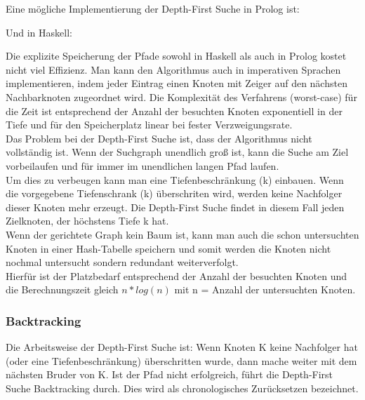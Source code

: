 \bigskip

Eine mögliche Implementierung der Depth-First Suche in Prolog ist:\\




\bigskip

Und in Haskell:\\
\newpage



\bigskip

Die explizite Speicherung der Pfade sowohl in Haskell als auch in Prolog kostet nicht viel Effizienz. Man kann den Algorithmus auch in imperativen Sprachen implementieren, indem jeder Eintrag einen Knoten mit Zeiger auf den nächsten Nachbarknoten zugeordnet wird. Die Komplexität des Verfahrens (worst-case) für die Zeit ist entsprechend der Anzahl der besuchten Knoten exponentiell in der Tiefe und für den Speicherplatz linear bei fester Verzweigungsrate.\\

Das Problem bei der Depth-First Suche ist, dass der Algorithmus nicht vollständig ist. Wenn der Suchgraph unendlich groß ist, kann die Suche am Ziel vorbeilaufen und für immer im unendlichen langen Pfad laufen.\\

Um dies zu verbeugen kann man eine Tiefenbeschränkung (k) einbauen. Wenn die vorgegebene Tiefenschrank (k) überschriten wird, werden keine Nachfolger dieser Knoten mehr erzeugt. Die Depth-First Suche findet in diesem Fall jeden Zielknoten, der höchstens Tiefe k hat.\\

Wenn der gerichtete Graph kein Baum ist, kann man auch die schon untersuchten Knoten in einer Hash-Tabelle speichern und somit werden die Knoten nicht nochmal untersucht sondern redundant weiterverfolgt.\\

Hierfür ist der Platzbedarf entsprechend der Anzahl der besuchten Knoten und die Berechnungszeit gleich $n*log(n)$ mit n = Anzahl der untersuchten Knoten.\\

\subsubsection{Backtracking}
\bigskip
Die Arbeitsweise der Depth-First Suche ist: Wenn Knoten K keine Nachfolger hat (oder eine Tiefenbeschränkung) überschritten wurde, dann mache weiter mit dem nächsten Bruder von K. Ist der Pfad nicht erfolgreich, führt die Depth-First Suche Backtracking durch. Dies wird als chronologisches Zurücksetzen bezeichnet.\\

